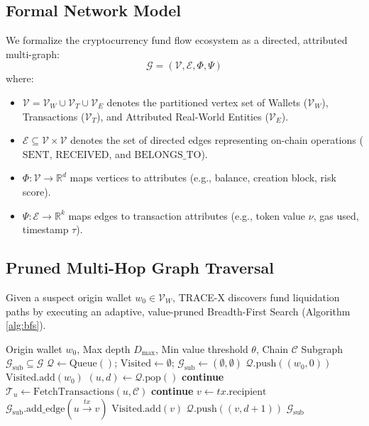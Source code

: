 \documentclass[10pt,twocolumn,a4paper]{article}
\begin{document}
\subsection{Formal Network Model}
We formalize the cryptocurrency fund flow ecosystem as a directed, attributed multi-graph:
\begin{equation}
    \mathcal{G} = (\mathcal{V}, \mathcal{E}, \Phi, \Psi)
\end{equation}
where:
\begin{itemize}[leftmargin=*]
    \item $\mathcal{V} = \mathcal{V}_W \cup \mathcal{V}_T \cup \mathcal{V}_E$ denotes the partitioned vertex set of Wallets ($\mathcal{V}_W$), Transactions ($\mathcal{V}_T$), and Attributed Real-World Entities ($\mathcal{V}_E$).
    \item $\mathcal{E} \subseteq \mathcal{V} \times \mathcal{V}$ denotes the set of directed edges representing on-chain operations ($\text{SENT}$, $\text{RECEIVED}$, and $\text{BELONGS\_TO}$).
    \item $\Phi: \mathcal{V} \to \mathbb{R}^d$ maps vertices to attributes (e.g., balance, creation block, risk score).
    \item $\Psi: \mathcal{E} \to \mathbb{R}^k$ maps edges to transaction attributes (e.g., token value $\nu$, gas used, timestamp $\tau$).
\end{itemize}

\subsection{Pruned Multi-Hop Graph Traversal}
Given a suspect origin wallet $w_0 \in \mathcal{V}_W$, TRACE-X discovers fund liquidation paths by executing an adaptive, value-pruned Breadth-First Search (Algorithm \ref{alg:bfs}).

\begin{algorithm}[h]
\caption{Pruned Multi-Hop Fund Flow Traversal}
\label{alg:bfs}
\begin{algorithmic}[1]
\Require Origin wallet $w_0$, Max depth $D_{\max}$, Min value threshold $\theta$, Chain $\mathcal{C}$
\Ensure Subgraph $\mathcal{G}_{\text{sub}} \subseteq \mathcal{G}$
\State $\mathcal{Q} \gets \text{Queue}()$; \quad $\text{Visited} \gets \emptyset$; \quad $\mathcal{G}_{\text{sub}} \gets (\emptyset, \emptyset)$
\State $\mathcal{Q}.\text{push}((w_0, 0))$
\State $\text{Visited}.\text{add}(w_0)$
    \State $(u, d) \gets \mathcal{Q}.\text{pop}()$
     \textbf{continue} \EndIf
    \State $\mathcal{T}_u \gets \text{FetchTransactions}(u, \mathcal{C})$
         \textbf{continue} \EndIf
        \State $v \gets tx.\text{recipient}$
        \State $\mathcal{G}_{\text{sub}}.\text{add\_edge}(u \xrightarrow{tx} v)$
            \State $\text{Visited}.\text{add}(v)$
            \State $\mathcal{Q}.\text{push}((v, d + 1))$
        \EndIf
    \EndFor
\EndWhile
\State \Return $\mathcal{G}_{\text{sub}}$
\end{algorithmic}
\end{algorithm}
\end{document}
